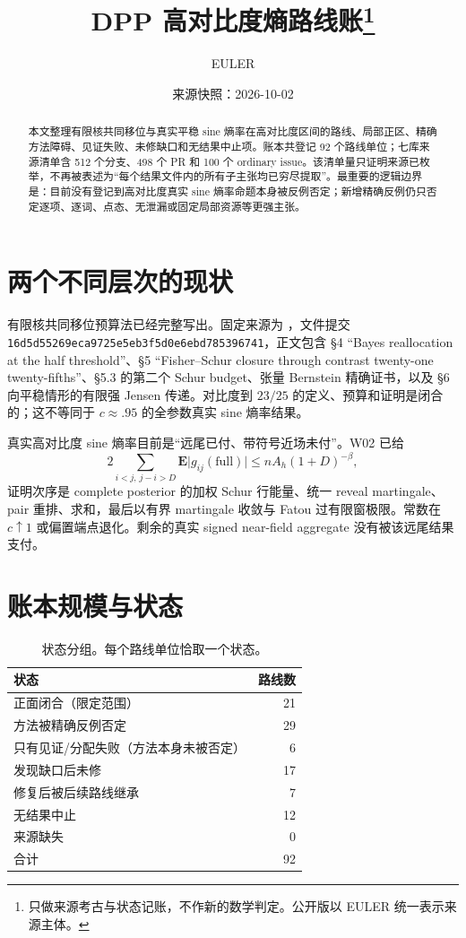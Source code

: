 \documentclass[UTF8,11pt]{ctexart}
\title{DPP 高对比度熵路线账\thanks{只做来源考古与状态记账，不作新的数学判定。公开版以 EULER 统一表示来源主体。}}
\author{EULER}
\date{来源快照：2026-10-02}
\newcommand{\code}[1]{\texttt{#1}}
\begin{document}
\maketitle

\begin{abstract}
本文整理有限核共同移位与真实平稳 sine 熵率在高对比度区间的路线、局部正区、精确方法障碍、见证失败、未修缺口和无结果中止项。账本共登记 92 个路线单位；七库来源清单含 512 个分支、498 个 PR 和 100 个 ordinary issue。该清单量只证明来源已枚举，不再被表述为“每个结果文件内的所有子主张均已穷尽提取”。最重要的逻辑边界是：目前没有登记到高对比度真实 sine 熵率命题本身被反例否定；新增精确反例仍只否定逐项、逐词、点态、无泄漏或固定局部资源等更强主张。
\end{abstract}

\section{两个不同层次的现状}

有限核共同移位预算法已经完整写出。固定来源为
，文件提交
\code{16d5d55269eca9725e5eb3f5d0e6ebd785396741}，正文包含 §4 ``Bayes reallocation at the half threshold''、§5 ``Fisher--Schur closure through contrast twenty-one twenty-fifths''、§5.3 的第二个 Schur budget、张量 Bernstein 精确证书，以及 §6 向平稳情形的有限强 Jensen 传递。对比度到 $23/25$ 的定义、预算和证明是闭合的；这不等同于 $c\approx .95$ 的全参数真实 sine 熵率结果。

真实高对比度 sine 熵率目前是“远尾已付、带符号近场未付”。W02 已给
\[
  2\sum_{i<j,\,j-i>D}\mathbf E\lvert g_{ij}(\mathrm{full})\rvert
  \le nA_h(1+D)^{-\beta},
\]
证明次序是 complete posterior 的加权 Schur 行能量、统一 reveal martingale、pair 重排、求和，最后以有界 martingale 收敛与 Fatou 过有限窗极限。常数在 $c\uparrow1$ 或偏置端点退化。剩余的真实 signed near-field aggregate 没有被该远尾结果支付。

\section{账本规模与状态}

\begin{table}[H]
\centering
\begin{tabular}{lr}
\toprule
状态 & 路线数\\
\midrule
正面闭合（限定范围） & 21\\
方法被精确反例否定 & 29\\
只有见证/分配失败（方法本身未被否定） & 6\\
发现缺口后未修 & 17\\
修复后被后续路线继承 & 7\\
无结果中止 & 12\\
来源缺失 & 0\\
\midrule
合计 & 92\\
\bottomrule
\end{tabular}
\caption{状态分组。每个路线单位恰取一个状态。}
\end{table}
\end{document}
